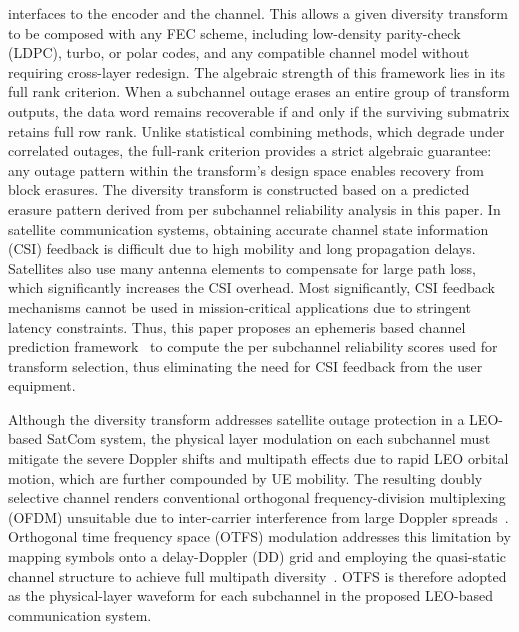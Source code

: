 \documentclass[lettersize,journal]{IEEEtran}
\begin{document}
interfaces to the encoder and the channel. This allows a given diversity transform to be composed with any FEC scheme, including low-density parity-check (LDPC), turbo, or polar codes, and any compatible channel model without requiring cross-layer redesign. The algebraic strength of this framework lies in its full rank criterion. When a subchannel outage erases an entire group of transform outputs, the data word remains recoverable if and only if the surviving submatrix retains full row rank. Unlike statistical combining methods, which degrade under correlated outages, the full-rank criterion provides a strict algebraic guarantee: any outage pattern within the transform’s design space enables recovery from block erasures.
The diversity transform is constructed based on a predicted erasure
pattern derived from per subchannel reliability analysis in this paper. In satellite communication systems, obtaining accurate channel state information (CSI) feedback is difficult due to high mobility and long propagation delays. Satellites also use many antenna elements to compensate for large path loss, which significantly increases the CSI overhead. Most significantly, CSI feedback mechanisms cannot be used in mission‑critical applications due to stringent latency constraints. Thus, this paper proposes an ephemeris based channel prediction framework~\cite{10902219} to compute the per subchannel reliability scores used for transform selection, thus eliminating the need for CSI feedback from the user equipment.

Although the diversity transform addresses satellite outage protection in a LEO-based SatCom system, the physical layer modulation on each subchannel must mitigate the severe Doppler shifts and multipath effects due to rapid LEO orbital motion, which are further compounded by UE mobility. The resulting doubly selective channel renders conventional orthogonal frequency-division multiplexing (OFDM) unsuitable due to inter-carrier interference from large Doppler spreads~\cite{Li2021}. Orthogonal time frequency space (OTFS) modulation addresses this limitation by mapping symbols onto a delay-Doppler (DD) grid and employing the quasi-static channel structure to achieve full multipath diversity~\cite{Hadani2017,Raviteja2018}. OTFS is therefore adopted as the physical-layer waveform for each subchannel in the proposed LEO-based communication system.
\end{document}
